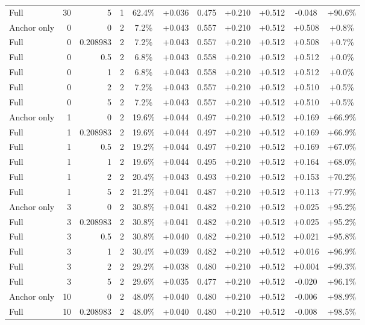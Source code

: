 \begin{table}[htbp]
\begin{tabular}{lrrrccccccc}
Full & 30 & 5 & 1 & 62.4\% & +0.036 & 0.475 & +0.210 & +0.512 & -0.048 & +90.6\% \\
Anchor only & 0 & 0 & 2 & 7.2\% & +0.043 & 0.557 & +0.210 & +0.512 & +0.508 & +0.8\% \\
Full & 0 & 0.208983 & 2 & 7.2\% & +0.043 & 0.557 & +0.210 & +0.512 & +0.508 & +0.7\% \\
Full & 0 & 0.5 & 2 & 6.8\% & +0.043 & 0.558 & +0.210 & +0.512 & +0.512 & +0.0\% \\
Full & 0 & 1 & 2 & 6.8\% & +0.043 & 0.558 & +0.210 & +0.512 & +0.512 & +0.0\% \\
Full & 0 & 2 & 2 & 7.2\% & +0.043 & 0.557 & +0.210 & +0.512 & +0.510 & +0.5\% \\
Full & 0 & 5 & 2 & 7.2\% & +0.043 & 0.557 & +0.210 & +0.512 & +0.510 & +0.5\% \\
Anchor only & 1 & 0 & 2 & 19.6\% & +0.044 & 0.497 & +0.210 & +0.512 & +0.169 & +66.9\% \\
Full & 1 & 0.208983 & 2 & 19.6\% & +0.044 & 0.497 & +0.210 & +0.512 & +0.169 & +66.9\% \\
Full & 1 & 0.5 & 2 & 19.2\% & +0.044 & 0.497 & +0.210 & +0.512 & +0.169 & +67.0\% \\
Full & 1 & 1 & 2 & 19.6\% & +0.044 & 0.495 & +0.210 & +0.512 & +0.164 & +68.0\% \\
Full & 1 & 2 & 2 & 20.4\% & +0.043 & 0.493 & +0.210 & +0.512 & +0.153 & +70.2\% \\
Full & 1 & 5 & 2 & 21.2\% & +0.041 & 0.487 & +0.210 & +0.512 & +0.113 & +77.9\% \\
Anchor only & 3 & 0 & 2 & 30.8\% & +0.041 & 0.482 & +0.210 & +0.512 & +0.025 & +95.2\% \\
Full & 3 & 0.208983 & 2 & 30.8\% & +0.041 & 0.482 & +0.210 & +0.512 & +0.025 & +95.2\% \\
Full & 3 & 0.5 & 2 & 30.8\% & +0.040 & 0.482 & +0.210 & +0.512 & +0.021 & +95.8\% \\
Full & 3 & 1 & 2 & 30.4\% & +0.039 & 0.482 & +0.210 & +0.512 & +0.016 & +96.9\% \\
Full & 3 & 2 & 2 & 29.2\% & +0.038 & 0.480 & +0.210 & +0.512 & +0.004 & +99.3\% \\
Full & 3 & 5 & 2 & 29.6\% & +0.035 & 0.477 & +0.210 & +0.512 & -0.020 & +96.1\% \\
Anchor only & 10 & 0 & 2 & 48.0\% & +0.040 & 0.480 & +0.210 & +0.512 & -0.006 & +98.9\% \\
Full & 10 & 0.208983 & 2 & 48.0\% & +0.040 & 0.480 & +0.210 & +0.512 & -0.008 & +98.5\% \\

\end{tabular}
\end{table}
